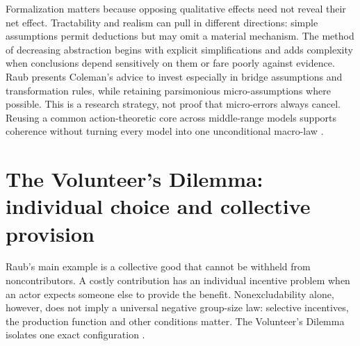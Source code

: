 Formalization matters because opposing qualitative effects need not reveal
their net effect. Tractability and realism can pull in different directions:
simple assumptions permit deductions but may omit a material mechanism.
The method of decreasing abstraction begins with explicit simplifications
and adds complexity when conclusions depend sensitively on them or fare
poorly against evidence. Raub presents Coleman's advice to invest especially
in bridge assumptions and transformation rules, while retaining parsimonious
micro-assumptions where possible. This is a research strategy, not proof that
micro-errors always cancel. Reusing a common action-theoretic core across
middle-range models supports coherence without turning every model into one
unconditional macro-law
\parencite[pp.~614--615, 619--620]{Raub2021RationalChoiceSocialSciences}.

\section{The Volunteer's Dilemma: individual choice and collective provision}
\label{sec:p17-rat104-vod}

Raub's main example is a collective good that cannot be withheld from
noncontributors. A costly contribution has an individual incentive problem
when an actor expects someone else to provide the benefit. Nonexcludability
alone, however, does not imply a universal negative group-size law: selective
incentives, the production function and other conditions matter. The
Volunteer's Dilemma isolates one exact configuration
\parencite[pp.~612--615]{Raub2021RationalChoiceSocialSciences}.


